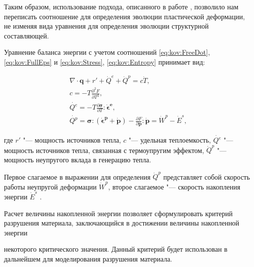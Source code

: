 Таким образом, использование подхода, описанного в работе \cite{kostina:bib:MurakamiB}, позволило нам переписать соотношение для определения эволюции пластической деформации, не изменяя вида уравнения для определения эволюции структурной составляющей.



\smallskip




Уравнение баланса энергии с учетом соотношений \eqref{eq:kov:FreeDot}, \eqref{eq:kov:FullEps} и \eqref{eq:kov:Stress}, \eqref{eq:kov:Entropy} принимает вид:

\begin{gather}

\nabla\cdot\boldsymbol{q}+r'+\dot{Q}^{e}+\dot{Q}^{p}=c\dot{T},\\

c=-T\frac{\partial^2 F}{\partial T^2},\\

\dot{Q^e}=-T\frac{\partial{\boldsymbol{\sigma}}}{\partial T}:\boldsymbol{\dot{\epsilon}^{e}},\\

\dot{Q^p}=\boldsymbol{\sigma}:(\boldsymbol{\dot{\epsilon}^{p}}+\boldsymbol{\dot{p}})-\frac{\partial F}{\partial \boldsymbol{p}}:\boldsymbol{\dot{p}}=\dot{W}^p-\dot{E}^s, \label{eq:kov:EnergyBalance}

\end{gather}

где $r'$ "--- мощность источников тепла, $c$ "--- удельная теплоемкость, $\dot{Q^e}$ "---  мощность источников тепла, связанная с термоупругим эффектом, $\dot{Q}^p$ "---  мощность неупругого вклада в генерацию тепла.

Первое слагаемое в выражении для определения $\dot{Q}^p$ представляет собой скорость работы неупругой деформации $\dot{W}^p$, второе слагаемое "--- скорость накопления энергии $\dot{E}^s$ .

Расчет величины накопленной энергии позволяет сформулировать критерий разрушения материала, заключающийся в достижении величины накопленной энергии

некоторого критического значения. Данный критерий будет использован в дальнейшем для моделирования разрушения материала.



\smallskip




